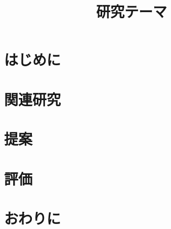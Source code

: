 \documentclass[a4paper, twocolumn, dvipdfmx, autodetect-engine]{jsarticle}
\begin{document}
\title{
  \textbf{研究テーマ}
}
\author{}
\date{}

\maketitle

\section{はじめに}

\section{関連研究}

\section{提案}

\section{評価}

\section{おわりに}



\fontsize{9.2pt}{9.2pt}\selectfont


\end{document}
